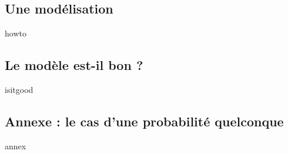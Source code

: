 \subsection{Une modélisation}

{howto}



\subsection{Le modèle est-il bon ?}

{isitgood}



\subsection{Annexe : le cas d'une probabilité quelconque}

{annex}


